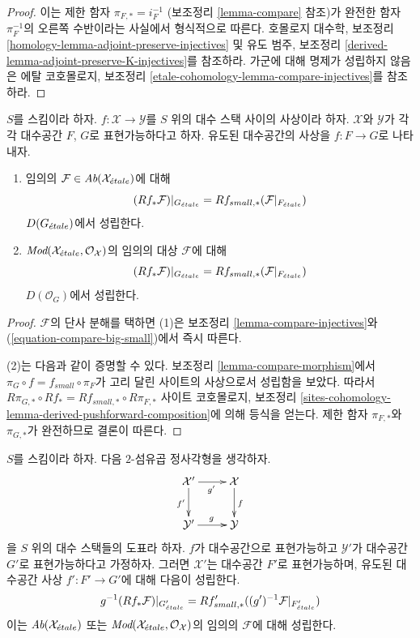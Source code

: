 \begin{proof}
이는 제한 함자 $\pi_{F,*}=i_F^{-1}$
(보조정리 \ref{lemma-compare} 참조)가 완전한 함자 $\pi_F^{-1}$의
오른쪽 수반이라는 사실에서 형식적으로 따른다. 호몰로지 대수학, 보조정리
\ref{homology-lemma-adjoint-preserve-injectives} 및 유도 범주,
보조정리 \ref{derived-lemma-adjoint-preserve-K-injectives}를 참조하라.
가군에 대해 명제가 성립하지 않음은 에탈 코호몰로지, 보조정리
\ref{etale-cohomology-lemma-compare-injectives}를 참조하라.
\end{proof}

\begin{lemma}
\label{lemma-compare-morphism-cohomology}
$S$를 스킴이라 하자. $f : \mathcal{X} \to \mathcal{Y}$를 $S$ 위의
대수 스택 사이의 사상이라 하자. $\mathcal{X}$와 $\mathcal{Y}$가
각각 대수공간 $F$, $G$로 표현가능하다고 하자. 유도된 대수공간의
사상을 $f : F \to G$로 나타내자.
\begin{enumerate}
\item 임의의 $\mathcal{F} \in \textit{Ab}(\mathcal{X}_{\acute{e}tale})$에 대해
$$
(Rf_*\mathcal{F})|_{G_{\acute{e}tale}} =
Rf_{small, *}(\mathcal{F}|_{F_{\acute{e}tale}})
$$
$D(G_{\acute{e}tale})$에서 성립한다.
\item $\textit{Mod}(\mathcal{X}_{\acute{e}tale}, \mathcal{O}_\mathcal{X})$의
임의의 대상 $\mathcal{F}$에 대해
$$
(Rf_*\mathcal{F})|_{G_{\acute{e}tale}} =
Rf_{small, *}(\mathcal{F}|_{F_{\acute{e}tale}})
$$
$D(\mathcal{O}_G)$에서 성립한다.
\end{enumerate}
\end{lemma}

\begin{proof}
 $\mathcal{F}$의 단사 분해를 택하면 (1)은 보조정리 \ref{lemma-compare-injectives}와
(\ref{equation-compare-big-small})에서 즉시 따른다.

\medskip\noindent
 (2)는 다음과 같이 증명할 수 있다. 보조정리
\ref{lemma-compare-morphism}에서 $\pi_G \circ f =
f_{small} \circ \pi_F$가 고리 달린 사이트의 사상으로서 성립함을
보았다. 따라서
$R\pi_{G, *} \circ Rf_* = Rf_{small, *} \circ R\pi_{F, *}$
사이트 코호몰로지, 보조정리
\ref{sites-cohomology-lemma-derived-pushforward-composition}에 의해
등식을 얻는다. 제한 함자 $\pi_{F,*}$와 $\pi_{G,*}$가 완전하므로
결론이 따른다.
\end{proof}

\begin{lemma}
\label{lemma-compare-representable-morphism-cohomology}
$S$를 스킴이라 하자. 다음 $2$-섬유곱 정사각형을 생각하자.
$$
\xymatrix{
\mathcal{X}' \ar[r]_{g'} \ar[d]_{f'} & \mathcal{X} \ar[d]^f \\
\mathcal{Y}' \ar[r]^g & \mathcal{Y}
}
$$
을 $S$ 위의 대수 스택들의 도표라 하자. $f$가 대수공간으로
표현가능하고 $\mathcal{Y}'$가 대수공간 $G'$로 표현가능하다고
가정하자. 그러면 $\mathcal{X}'$는 대수공간 $F'$로 표현가능하며,
유도된 대수공간 사상 $f' : F' \to G'$에 대해 다음이 성립한다.
$$
g^{-1}(Rf_*\mathcal{F})|_{G'_{\acute{e}tale}} =
Rf'_{small, *}((g')^{-1}\mathcal{F}|_{F'_{\acute{e}tale}})
$$
이는 $\textit{Ab}(\mathcal{X}_{\acute{e}tale})$ 또는
$\textit{Mod}(\mathcal{X}_{\acute{e}tale}, \mathcal{O}_\mathcal{X})$의
임의의 $\mathcal{F}$에 대해 성립한다.
\end{lemma}

